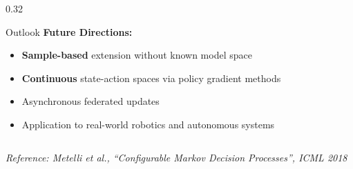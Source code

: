 \documentclass[final,t]{beamer}
\begin{document}
\begin{frame}[t]
\begin{columns}[T]
\begin{column}{0.32\textwidth}
\begin{block}{Outlook}
\textbf{Future Directions:}
\begin{itemize}
    \item \textbf{Sample-based} extension without known model space
    \item \textbf{Continuous} state-action spaces via policy gradient methods
    \item Asynchronous federated updates
    \item Application to real-world robotics and autonomous systems
\end{itemize}
\end{block}
\end{column}

\end{columns}

\vspace{0.5cm}
\begin{center}
\small\textit{Reference: Metelli et al., ``Configurable Markov Decision Processes'', ICML 2018}
\end{center}

\end{frame}
\end{document}
